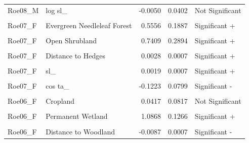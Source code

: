 \documentclass[10pt,a4paper]{article}
\begin{document}
\begin{longtable}[t]{llrrl}
Roe08\_M & log sl\_ & -0.0050 & 0.0402 & Not Significant\\
\cellcolor{gray!10}{Roe08\_M} & \cellcolor{gray!10}{cos ta\_} & \cellcolor{gray!10}{-0.5853} & \cellcolor{gray!10}{0.0361} & \cellcolor{gray!10}{Significant -}\\
Roe07\_F & Evergreen Needleleaf Forest & 0.5556 & 0.1887 & Significant +\\
\cellcolor{gray!10}{Roe07\_F} & \cellcolor{gray!10}{Tall Grassland} & \cellcolor{gray!10}{0.0465} & \cellcolor{gray!10}{1.0541} & \cellcolor{gray!10}{Not Significant}\\
\addlinespace
Roe07\_F & Open Shrubland & 0.7409 & 0.2894 & Significant +\\
\cellcolor{gray!10}{Roe07\_F} & \cellcolor{gray!10}{Distance to Woodland} & \cellcolor{gray!10}{-0.0068} & \cellcolor{gray!10}{0.0021} & \cellcolor{gray!10}{Significant -}\\
Roe07\_F & Distance to Hedges & 0.0028 & 0.0007 & Significant +\\
\cellcolor{gray!10}{Roe07\_F} & \cellcolor{gray!10}{Road Crossing} & \cellcolor{gray!10}{-0.2483} & \cellcolor{gray!10}{0.1817} & \cellcolor{gray!10}{Significant -}\\
Roe07\_F & sl\_ & 0.0019 & 0.0007 & Significant +\\
\addlinespace
\cellcolor{gray!10}{Roe07\_F} & \cellcolor{gray!10}{log sl\_} & \cellcolor{gray!10}{-0.0331} & \cellcolor{gray!10}{0.0668} & \cellcolor{gray!10}{Not Significant}\\
Roe07\_F & cos ta\_ & -0.1223 & 0.0799 & Significant -\\
\cellcolor{gray!10}{Roe06\_F} & \cellcolor{gray!10}{Evergreen Needleleaf Forest} & \cellcolor{gray!10}{-14.1975} & \cellcolor{gray!10}{1168.4078} & \cellcolor{gray!10}{Not Significant}\\
Roe06\_F & Cropland & 0.0417 & 0.0817 & Not Significant\\
\cellcolor{gray!10}{Roe06\_F} & \cellcolor{gray!10}{Tall Grassland} & \cellcolor{gray!10}{-0.0412} & \cellcolor{gray!10}{0.0776} & \cellcolor{gray!10}{Not Significant}\\
\addlinespace
Roe06\_F & Permanent Wetland & 1.0868 & 0.1266 & Significant +\\
\cellcolor{gray!10}{Roe06\_F} & \cellcolor{gray!10}{Human Settlements} & \cellcolor{gray!10}{-13.7704} & \cellcolor{gray!10}{1151.4231} & \cellcolor{gray!10}{Not Significant}\\
Roe06\_F & Distance to Woodland & -0.0087 & 0.0007 & Significant -\\

\end{longtable}
\end{document}
